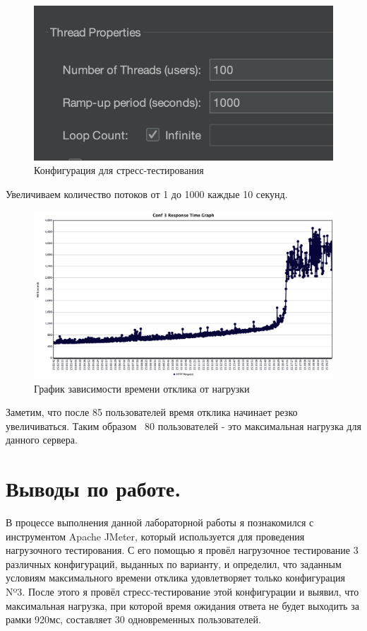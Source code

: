\documentclass[12pt,onecolumn]{article}
\begin{document}
\begin{figure}[H]
  \includegraphics[width=\textwidth]{image/final-conf.png}
  \caption{Конфигурация для стресс-тестирования}
\end{figure}
Увеличиваем количество потоков от 1 до 1000 каждые 10 секунд.
\begin{figure}[H]
  \includegraphics[width=\textwidth]{image/resp-time-graph.png}
  \caption{График зависимости времени отклика от нагрузки}
\end{figure}

Заметим, что после 85 пользователей время отклика начинает резко увеличиваться.
Таким образом ~80 пользователей - это максимальная нагрузка для данного сервера. 





\section*{Выводы по работе.}
В процессе выполнения данной лабораторной работы я познакомился с
инструментом Apache JMeter, который используется для проведения нагрузочного тестирования. С
его помощью я провёл нагрузочное тестирование 3 различных конфигураций, выданных по
варианту, и определил, что заданным условиям максимального времени отклика удовлетворяет
только конфигурация Nº3. После этого я провёл стресс-тестирование этой конфигурации и
выявил, что максимальная нагрузка, при которой время ожидания ответа не будет выходить за
рамки 920мс, составляет 30 одновременных пользователей.
\end{document}

